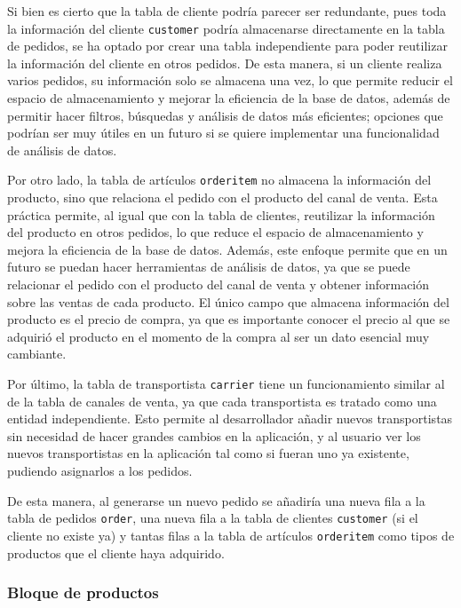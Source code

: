 Si bien es cierto que la tabla de cliente podría parecer ser redundante, pues toda la información del cliente \texttt{customer} podría almacenarse directamente en la tabla de pedidos, se ha optado por crear una tabla independiente para poder reutilizar la información del cliente en otros pedidos. De esta manera, si un cliente realiza varios pedidos, su información solo se almacena una vez, lo que permite reducir el espacio de almacenamiento y mejorar la eficiencia de la base de datos, además de permitir hacer filtros, búsquedas y análisis de datos más eficientes; opciones que podrían ser muy útiles en un futuro si se quiere implementar una funcionalidad de análisis de datos.

Por otro lado, la tabla de artículos \texttt{orderitem} no almacena la información del producto, sino que relaciona el pedido con el producto del canal de venta. Esta práctica permite, al igual que con la tabla de clientes, reutilizar la información del producto en otros pedidos, lo que reduce el espacio de almacenamiento y mejora la eficiencia de la base de datos. Además, este enfoque permite que en un futuro se puedan hacer herramientas de análisis de datos, ya que se puede relacionar el pedido con el producto del canal de venta y obtener información sobre las ventas de cada producto. El único campo que almacena información del producto es el precio de compra, ya que es importante conocer el precio al que se adquirió el producto en el momento de la compra al ser un dato esencial muy cambiante.

Por último, la tabla de transportista \texttt{carrier} tiene un funcionamiento similar al de la tabla de canales de venta, ya que cada transportista es tratado como una entidad independiente. Esto permite al desarrollador añadir nuevos transportistas sin necesidad de hacer grandes cambios en la aplicación, y al usuario ver los nuevos transportistas en la aplicación tal como si fueran uno ya existente, pudiendo asignarlos a los pedidos.

De esta manera, al generarse un nuevo pedido se añadiría una nueva fila a la tabla de pedidos \texttt{order}, una nueva fila a la tabla de clientes \texttt{customer} (si el cliente no existe ya) y tantas filas a la tabla de artículos \texttt{orderitem} como tipos de productos que el cliente haya adquirido.

\subsubsection{Bloque de productos}

